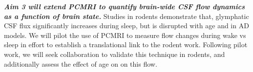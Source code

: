 \textbf{\textit{Aim 3 will extend PCMRI to quantify brain-wide CSF flow dynamics as a function of brain state.}} Studies in rodents demonstrate that, glymphatic CSF flux significantly increases during sleep, but is disrupted with age and in AD models. We will pilot the use of PCMRI to measure flow changes during wake vs sleep in effort to establish a translational link to the rodent work. Following pilot work, we will seek collaboration to validate this technique in rodents, and additionally assess the effect of age on on this flow.

